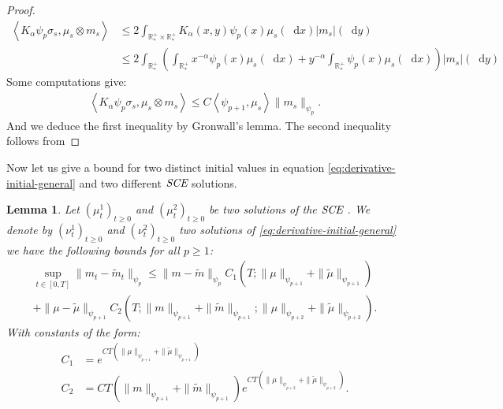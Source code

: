 \documentclass[11pt,a4paper]{article}
\newcommand{\RRP}{\mathbb{R}^+_*}
\newcommand{\SCE}{\emph{SCE}}
\newcommand{\Proc}[1]{\left(#1\right)_{t\geq 0}}
\newcommand{\brac}[1]{\left\langle#1\right\rangle}
\newcommand{\dd}{\mathop{}\!\mathrm{d}}
\newtheorem{lemma}[theorem]{Lemma}
\begin{document}
\begin{proof}
    \begin{align*}
        \brac{K_\alpha \psi_p\sigma_s, \mu_s\otimes m_s} 
        &\leq 2\int_{\RRP\times\RRP} K_\alpha(x,y) \psi_p(x)\mu_s(\dd x)|m_s|(\dd y)\\
        &\leq 2\int_{\RRP} \left(\int_{\RRP}x^{-\alpha}\psi_p(x)\mu_s(\dd x) + y^{-\alpha} \int_{\RRP}\psi_p(x)\mu_s(\dd x)\right) |m_s|(\dd y)
    \end{align*}
    Some computations give:
    \begin{align*}
        \brac{K_\alpha \psi_p\sigma_s, \mu_s\otimes m_s}  \leq C\brac{\psi_{p+1},\mu_s} \| m_s\|_{\psi_p}.
    \end{align*}
    And we deduce the first inequality by Gronwall's lemma. The second inequality follows from 
\end{proof}
Now let us give a bound for two distinct initial values in equation \eqref{eq:derivative-initial-general} and two different $\SCE$ solutions.
\begin{lemma}\label{lem:pseudo-lip-derivative-eq}
     Let $\Proc{\mu^1_t}$ and $\Proc{\mu^2_t}$ be two solutions of the $\SCE$ . We denote by $\Proc{\nu^1_t}$ and $\Proc{\nu^2_t}$ two solutions of \eqref{eq:derivative-initial-general} we have the following bounds for all $p \geq 1$:
    \begin{multline*}
        \sup\limits_{t \in [0,T]} \| m_t - \tilde{m}_t \|_{\psi_p} \leq \|m- \tilde{m} \|_{\psi_{p}} C_1\left(T;\| \mu\|_{\psi_{p+1}} + \| \tilde{\mu}\|_{\psi_{p+1}}\right)\\
        + \|\mu - \tilde{\mu} \|_{\psi_{p+1}}C_2\left(T; \|m\|_{\psi_{p+1}}+ \|\tilde{m}\|_{\psi_{p+1}};\|\mu\|_{\psi_{p +2}} + \|\tilde{\mu}\|_{\psi_{p +2}}\right).
    \end{multline*}
    With constants of the form:
    \begin{align*}
        C_1 &= e^{CT\left(\| \mu\|_{\psi_{p+1}} + \|\tilde{ \mu}\|_{\psi_{p+1}}\right)}\\
        C_2 &= CT(\|m\|_{\psi_{p+1}}+ \|\tilde{m}\|_{\psi_{p+1}})e^{CT\left(\| \mu\|_{\psi_{p+2}} + \|\tilde{ \mu}\|_{\psi_{p+2}}\right)}.
    \end{align*}
\end{lemma}
\end{document}
